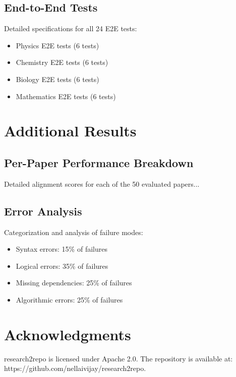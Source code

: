 \documentclass[10pt]{article}
\begin{document}
\subsection{End-to-End Tests}
Detailed specifications for all 24 E2E tests:
\begin{itemize}
    \item Physics E2E tests (6 tests)
    \item Chemistry E2E tests (6 tests)
    \item Biology E2E tests (6 tests)
    \item Mathematics E2E tests (6 tests)
\end{itemize}

\section{Additional Results}

\subsection{Per-Paper Performance Breakdown}
Detailed alignment scores for each of the 50 evaluated papers...

\subsection{Error Analysis}
Categorization and analysis of failure modes:
\begin{itemize}
    \item Syntax errors: 15\% of failures
    \item Logical errors: 35\% of failures
    \item Missing dependencies: 25\% of failures
    \item Algorithmic errors: 25\% of failures
\end{itemize}

\section*{Acknowledgments}

research2repo is licensed under Apache 2.0. The repository is available at: https://github.com/nellaivijay/research2repo.
\end{document}
